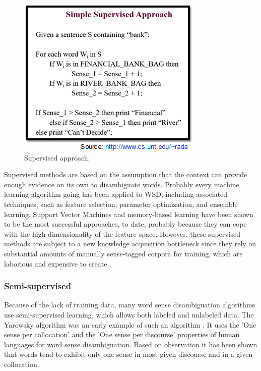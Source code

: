 \begin{figure}[tbh]
	\begin{center}
		\includegraphics[width=\columnwidth]{Union_Background_Chart_sup3}
	\end{center}
	\caption{Supervised approach.}
\end{figure}

Supervised methods are based on the assumption that the context can provide enough evidence on its own to disambiguate words. Probably every machine learning algorithm going has been applied to WSD, including associated techniques, such as feature selection, parameter optimization, and ensemble learning. Support Vector Machines and memory-based learning have been shown to be the most successful approaches, to date, probably because they can cope with the high-dimensionality of the feature space. However, these supervised methods are subject to a new knowledge acquisition bottleneck since they rely on substantial amounts of manually sense-tagged corpora for training, which are laborious and expensive to create \cite{aramossoto2016onthe}.

\subsubsection*{Semi-supervised}

Because of the lack of training data, many word sense disambiguation algorithms use semi-supervised learning, which allows both labeled and unlabeled data. The Yarowsky algorithm was an early example of such an algorithm \cite{Gartner201317}. It uses the 'One sense per collocation' and the 'One sense per discourse' properties of human languages for word sense disambiguation. Based on observation it has been shown that words tend to exhibit only one sense in most given discourse and in a given collocation. 

